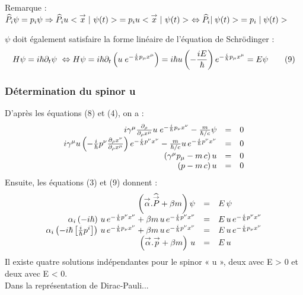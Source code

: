 Remarque : $\widehat{P}_i\psi=p_i\psi \Rightarrow \widehat{P}_iu<{{\overset{\rightarrow}{x}}}\;|\ {\psi(t)}>\;=
p_iu<{{\overset{\rightarrow}{x}}}\;|\ {\psi(t)}>\ \Leftrightarrow \widehat{P}_i|\;{\psi(t)}>\;=p_i\;|\;{\psi(t)}>\;$

$\psi$ doit également satisfaire la forme linéaire de l’équation de Schrödinger :
\[
H\psi=i\hbar\partial_t\psi\ \Leftrightarrow H\psi=i\hbar\partial_t\left(u\;e^{-\frac{i}{\hbar} p_\mu x^\mu}
\right)=i\hbar u\left(-\frac{iE}{\hbar}\right)e^{-\frac{i}{\hbar} p_\mu x^\mu}=E\psi\tag{9}
\]
\subsubsection{Détermination du spinor u}
D'après les équations (8) et (4), on a :
\[\begin{array}{ r c l }
i\gamma^\mu\frac{\partial_\rho}{\partial_\rho x^\mu}u\;e^{-\frac{i}{\hbar} p_\nu x^\nu}-\frac{m}{\hbar/c}\psi & = & 0 \\
i\gamma^\mu u\left(-\frac{i}{\hbar} p^\nu\frac{\partial_\rho x^\nu}{\partial_\rho x^\mu}\right)e^{-\frac{i}{\hbar} p^\nu x^\nu} - 
\frac{m}{\hbar/c}u\,e^{-\frac{i}{\hbar} p^\nu x^\nu} & = & 0 \\
(\gamma^\mu p_\mu-m\,c)\,u & = & 0 \\
(p-m\,c)\,u & = & 0 \\
\end{array}\]
Ensuite, les équations (3) et (9) donnent :
\[\begin{array}{ r c l }
\left({\overset{\rightarrow}{\alpha}}.\widehat{{\overset{\rightarrow}{P}}}+\beta m\right)\psi & = & E\,\psi \\
\alpha_i\left(-i\hbar\right)\, u\,e^{-\frac{i}{\hbar} p^\nu x^\nu}+\beta m\,u\,e^{-\frac{i}{\hbar} p^\nu x^\nu}
& = & E\,u\,e^{-\frac{i}{\hbar} p^\nu x^\nu} \\
\alpha_i\left(-i\hbar\left[\frac{i}{\hbar} p^i\right]\right)\,u\,e^{-\frac{i}{\hbar} p_\nu x^\nu}+
\beta m\,u\,e^{-\frac{i}{\hbar} p^\nu x^\nu} & = & E\,u\,e^{-\frac{i}{\hbar} p_\nu x^\nu} \\
\left({\overset{\rightarrow}{\alpha}}.{\overset{\rightarrow}{p}}+\beta m\right)\,u & = & E\,u \\
\end{array}\]
Il existe quatre solutions indépendantes pour le spinor « u », deux avec E >
0 et deux avec E < 0.\\

Dans la représentation de Dirac-Pauli...\\

